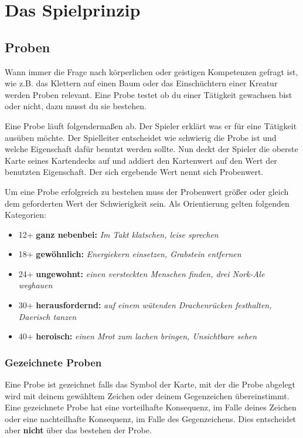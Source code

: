 \chapter{Das Spielprinzip}

\section{Proben}

Wann immer die Frage nach körperlichen oder geistigen Kompetenzen gefragt ist, wie z.B. das Klettern auf einen Baum oder das Einschüchtern einer Kreatur werden Proben relevant. Eine Probe testet ob du einer Tätigkeit gewachsen bist oder nicht, dazu musst du sie bestehen.

Eine Probe läuft folgendermaßen ab. Der Spieler erklärt was er für eine Tätigkeit ausüben möchte. Der Spielleiter entscheidet wie schwierig die Probe ist und welche Eigenschaft dafür benutzt werden sollte. Nun deckt der Spieler die oberste Karte seines Kartendecks auf und addiert den Kartenwert auf den Wert der benutzten Eigenschaft. Der sich ergebende Wert nennt sich Probenwert.

Um eine Probe erfolgreich zu bestehen muss der Probenwert größer oder gleich dem geforderten Wert der Schwierigkeit sein. Als Orientierung gelten folgenden Kategorien:

\begin{itemize}
    \item 12+ \textbf{ganz nebenbei:} \textit{Im Takt klatschen, leise sprechen}
    \item 18+ \textbf{gewöhnlich:} \textit{Energiekern einsetzen, Grabstein entfernen}
    \item 24+ \textbf{ungewohnt:} \textit{einen versteckten Menschen finden, drei Nork-Ale weghauen}
    \item 30+ \textbf{herausfordernd:} \textit{auf einem wütenden Drachenrücken festhalten, Daerisch tanzen}
    \item 40+ \textbf{heroisch:} \textit{einen Mrot zum lachen bringen, Unsichtbare sehen}
\end{itemize}

\subsection*{Gezeichnete Proben}
Eine Probe ist gezeichnet falls das Symbol der Karte, mit der die Probe abgelegt wird mit deinem gewähltem Zeichen oder deinem Gegenzeichen übereinstimmt. Eine gezeichnete Probe hat eine vorteilhafte Konsequenz, im Falle deines Zeichen oder eine nachteilhafte Konsequenz, im Falle des Gegenzeichens.
Dies entscheidet aber \textbf{nicht} über das bestehen der Probe.

